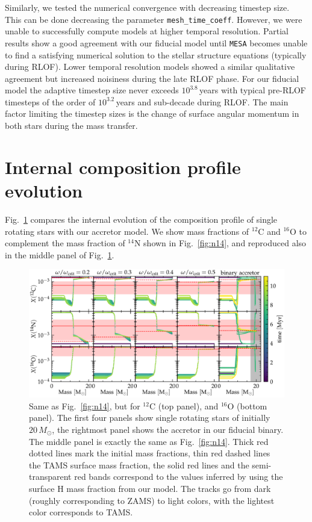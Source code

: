 \documentclass[twocolumn,twocolappendix,trackchanges]{aastex63}
\DeclareRobustCommand{\Figref}[1]{Fig.~\ref{#1}}
\begin{document}
Similarly, we tested the numerical convergence with decreasing
timestep size. This can be done decreasing the parameter
\texttt{mesh\_time\_coeff}. However, we were unable to successfully
compute models at higher temporal resolution. Partial results show a
good agreement with our fiducial model until \texttt{MESA} becomes
unable to find a satisfying numerical solution to the stellar
structure equations (typically
during RLOF). Lower temporal resolution models showed a similar
qualitative agreement but increased noisiness during the late RLOF
phase. For our fiducial model the adaptive timestep size never exceeds
$10^{3.8}$\,years with typical pre-RLOF timesteps of the order of $10^{3.2}$\,years
and sub-decade during RLOF. The main factor limiting the timestep
sizes is the change of surface angular momentum in both stars during
the mass transfer.


\section{Internal composition profile evolution}
\label{sec:X_fig}


\Figref{fig:composition_huge} compares the internal evolution of the composition
profile of single rotating stars with our accretor model.
We show mass fractions of $^{12}\mathrm{C}$  and $^{16}\mathrm{O}$ to complement the
mass fraction of $^{14}\mathrm{N}$ shown in \Figref{fig:n14}, and
reproduced also in the middle panel of \Figref{fig:composition_huge}.


\begin{figure}[hp]
  \centering
  \includegraphics[width=\textwidth]{huge_composition}
  \caption{Same as \Figref{fig:n14}, but for $^{12}\mathrm{C}$ (top
    panel), and $^{16}\mathrm{O}$ (bottom panel). The first four
    panels show single rotating stars of initially $20\,M_\odot$, the
    rightmost panel shows the accretor in our fiducial binary. The middle panel is
    exactly the same as \Figref{fig:n14}. Thick red dotted lines mark the
    initial mass fractions, thin red dashed lines the TAMS surface mass
    fraction, the solid red lines and the semi-transparent red bands
    correspond to the values inferred by 
    using the surface H mass fraction from our model. The tracks go
    from dark (roughly corresponding to ZAMS) to light colors, with the
    lightest color corresponds to TAMS.}
  \label{fig:composition_huge}
\end{figure}
\end{document}
